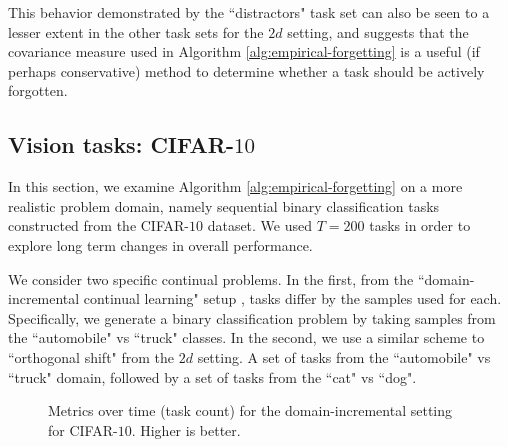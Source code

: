 \documentclass{article}
\theoremstyle{plain}
\theoremstyle{definition}
\theoremstyle{remark}
\begin{document}
This behavior demonstrated by the ``distractors" task set can also be seen to a lesser extent in the other task sets for the $2d$ setting, and suggests that the covariance measure used in Algorithm \ref{alg:empirical-forgetting} is a useful (if perhaps conservative) method to determine whether a task should be actively forgotten.

\subsection{Vision tasks: CIFAR-$10$}

In this section, we examine Algorithm \ref{alg:empirical-forgetting} on a more realistic problem domain, namely sequential binary classification tasks constructed from the CIFAR-$10$ \citep{krizhevsky2009learning} dataset. We used $T=200$ tasks in order to explore long term changes in overall performance.

We consider two specific continual problems. In the first, from the ``domain-incremental continual learning" setup \citep{de2021continual}, tasks differ by the samples used for each. Specifically, we generate a binary classification problem by taking samples from the ``automobile" vs ``truck" classes.   In the second, we use a similar scheme to ``orthogonal shift" from the $2d$ setting. A set of tasks from the ``automobile" vs ``truck" domain, followed by a set of tasks from the ``cat" vs ``dog".

\begin{figure}[ht]
\vskip 0.2in
\centering

\caption{Metrics over time (task count) for the domain-incremental setting for CIFAR-$10$. Higher is better. }
\label{cifar-static}
\vskip -0.2in
\end{figure}
\end{document}
